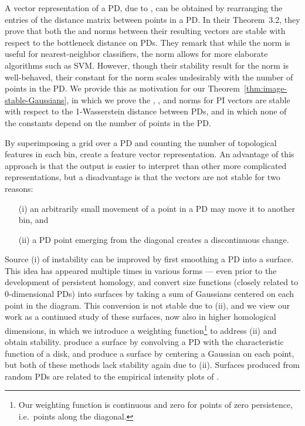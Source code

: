 \documentclass[11pt]{article}
\begin{document}
A vector representation of a PD, due to \citet{carriere2015stable}, can be obtained by rearranging the entries of the distance matrix between points in a PD. In their Theorem~3.2, they prove that both the  and  norms between their resulting vectors are stable with respect to the bottleneck distance on PDs. They remark that while the  norm is useful for nearest-neighbor classifiers, the  norm allows for more elaborate algorithms such as SVM. However, though their stability result for the  norm is well-behaved, their constant for the  norm scales undesirably with the number of points in the PD. We provide this as motivation for our Theorem~\ref{thm:image-stable-Gaussians}, in which we prove the , , and  norms for PI vectors are stable with respect to the 1-Wasserstein distance between PDs, and in which none of the constants depend on the number of points in the PD.


By superimposing a grid over a PD and counting the number of topological features in each bin, \citet{bendich2014topologicalLiz} create a feature vector representation. An advantage of this approach is that the output is easier to interpret than other more complicated representations, but a disadvantage is that the vectors are not stable for two reasons:
\begin{itemize}
\item[(i)] an arbitrarily small movement of a point in a PD may move it to another bin, and
\item[(ii)] a PD point emerging from the diagonal creates a discontinuous change.
\end{itemize}
Source (i) of instability can be improved by first smoothing a PD into a surface. This idea has appeared multiple times in various forms --- even prior to the development of persistent homology, \citet{donatini1998size} and \citet{ferri1997point} convert size functions (closely related to 0-dimensional PDs) into surfaces by taking a sum of Gaussians centered on each point in the diagram. This conversion is not stable due to (ii), and we view our work as a continued study of these surfaces, now also in higher homological dimensions, in which we introduce a weighting function\footnote{Our weighting function is continuous and zero for points of zero persistence, i.e.\ points along the diagonal.} to address (ii) and obtain stability. \citet{chung2009persistence} produce a surface by convolving a PD with the characteristic function of a disk, and \citet{pachauri2011topology} produce a surface by centering a Gaussian on each point, but both of these methods lack stability again due to (ii). Surfaces produced from random PDs are related to the empirical intensity plots of \citet{edelsbrunner2012current}.
\end{document}
